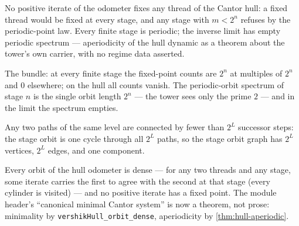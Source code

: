 \begin{theorem}\label{thm:hull-aperiodic}\leanok{}
No positive iterate of the odometer fixes any thread of the Cantor hull: a
fixed thread would be fixed at every stage, and any stage with $m < 2^n$
refuses by the periodic-point law. Every finite stage is periodic; the
inverse limit has empty periodic spectrum --- aperiodicity of the hull
dynamic as a theorem about the tower's own carrier, with no regime data
asserted.
\end{theorem}

\begin{theorem}\label{thm:tower-periodicity-dichotomy}\leanok{}
The bundle: at every finite stage the fixed-point counts are $2^n$ at
multiples of $2^n$ and $0$ elsewhere; on the hull all counts vanish. The
periodic-orbit spectrum of stage $n$ is the single orbit length $2^n$ ---
the tower sees only the prime $2$ --- and in the limit the spectrum empties.
\end{theorem}

\begin{theorem}\label{thm:vershik-stage-transitive}\leanok{}
Any two paths of the same level are connected by fewer than $2^L$ successor
steps: the stage orbit is one cycle through all $2^L$ paths, so the stage
orbit graph has $2^L$ vertices, $2^L$ edges, and one component.
\end{theorem}

\begin{theorem}\label{thm:vershik-hull-minimal}\leanok{}
Every orbit of the hull odometer is dense --- for any two threads and any
stage, some iterate carries the first to agree with the second at that stage
(every cylinder is visited) --- and no positive iterate has a fixed point.
The module header's ``canonical minimal Cantor system'' is now a theorem,
not prose: minimality by \texttt{vershikHull\_orbit\_dense}, aperiodicity by
\cref{thm:hull-aperiodic}.
\end{theorem}

